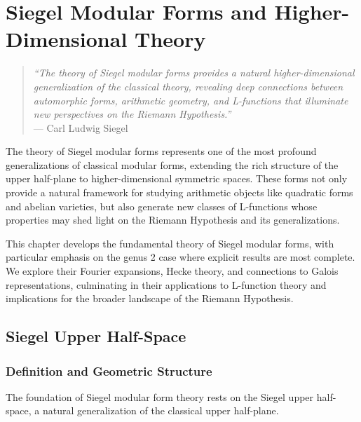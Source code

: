 
\chapter{Siegel Modular Forms and Higher-Dimensional Theory}
\label{ch:siegel}

\begin{quote}
\textit{``The theory of Siegel modular forms provides a natural higher-dimensional generalization of the classical theory, revealing deep connections between automorphic forms, arithmetic geometry, and L-functions that illuminate new perspectives on the Riemann Hypothesis.''} \\
--- Carl Ludwig Siegel
\end{quote}

The theory of Siegel modular forms represents one of the most profound generalizations of classical modular forms, extending the rich structure of the upper half-plane to higher-dimensional symmetric spaces. These forms not only provide a natural framework for studying arithmetic objects like quadratic forms and abelian varieties, but also generate new classes of L-functions whose properties may shed light on the Riemann Hypothesis and its generalizations.

This chapter develops the fundamental theory of Siegel modular forms, with particular emphasis on the genus 2 case where explicit results are most complete. We explore their Fourier expansions, Hecke theory, and connections to Galois representations, culminating in their applications to L-function theory and implications for the broader landscape of the Riemann Hypothesis.

\section{Siegel Upper Half-Space}
\label{sec:siegel_space}

\subsection{Definition and Geometric Structure}

The foundation of Siegel modular form theory rests on the Siegel upper half-space, a natural generalization of the classical upper half-plane.

